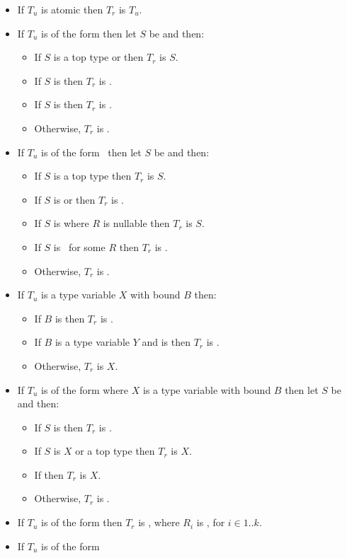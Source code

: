 \documentclass[makeidx]{article}
\begin{document}
{\begin{itemize}
\item
  If $T_u$ is atomic then $T_r$ is $T_u$.
\item If $T_u$ is of the form 
  then let $S$ be  and then:
  \begin{itemize}
  \item If $S$ is a top type or  then $T_r$ is $S$.
  \item If $S$ is  then $T_r$ is .
  \item If $S$ is  then $T_r$ is .
  \item Otherwise, $T_r$ is .
  \end{itemize}
\item If $T_u$ is of the form \ then
  let $S$ be  and then:
  \begin{itemize}
  \item If $S$ is a top type then $T_r$ is $S$.
  \item If $S$ is  or  then
    $T_r$ is .
  \item If $S$ is  where $R$ is nullable then
    $T_r$ is $S$.
  \item If $S$ is \ for some $R$ then $T_r$ is .
  \item Otherwise, $T_r$ is .
  \end{itemize}
\item If $T_u$ is a type variable $X$ with bound $B$ then:
  \begin{itemize}
  \item If $B$ is  then $T_r$ is .
  \item If $B$ is a type variable $Y$
    and  is 
    then $T_r$ is .
  \item Otherwise, $T_r$ is $X$.
  \end{itemize}
\item If $T_u$ is of the form 
  where $X$ is a type variable with bound $B$
  then let $S$ be  and then:
  \begin{itemize}
  \item If $S$ is  then $T_r$ is .
  \item If $S$ is $X$ or a top type then $T_r$ is $X$.
  \item If  then $T_r$ is $X$.
  \item Otherwise, $T_r$ is .
  \end{itemize}
\item If $T_u$ is of the form 
  then $T_r$ is ,
  where $R_i$ is , for $i \in 1 .. k$.
\item If $T_u$ is of the form


\end{itemize}}
\end{document}
